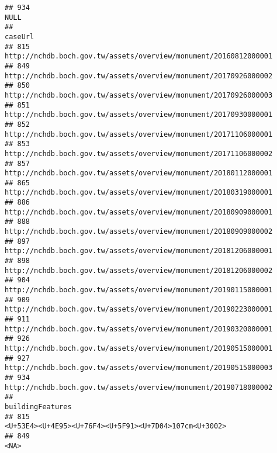 \documentclass[
]{article}
\begin{document}
\begin{verbatim}
## 934                                                                                                                                                                                                                                                                                                                               NULL
##                                                              caseUrl
## 815 http://nchdb.boch.gov.tw/assets/overview/monument/20160812000001
## 849 http://nchdb.boch.gov.tw/assets/overview/monument/20170926000002
## 850 http://nchdb.boch.gov.tw/assets/overview/monument/20170926000003
## 851 http://nchdb.boch.gov.tw/assets/overview/monument/20170930000001
## 852 http://nchdb.boch.gov.tw/assets/overview/monument/20171106000001
## 853 http://nchdb.boch.gov.tw/assets/overview/monument/20171106000002
## 857 http://nchdb.boch.gov.tw/assets/overview/monument/20180112000001
## 865 http://nchdb.boch.gov.tw/assets/overview/monument/20180319000001
## 886 http://nchdb.boch.gov.tw/assets/overview/monument/20180909000001
## 888 http://nchdb.boch.gov.tw/assets/overview/monument/20180909000002
## 897 http://nchdb.boch.gov.tw/assets/overview/monument/20181206000001
## 898 http://nchdb.boch.gov.tw/assets/overview/monument/20181206000002
## 904 http://nchdb.boch.gov.tw/assets/overview/monument/20190115000001
## 909 http://nchdb.boch.gov.tw/assets/overview/monument/20190223000001
## 911 http://nchdb.boch.gov.tw/assets/overview/monument/20190320000001
## 926 http://nchdb.boch.gov.tw/assets/overview/monument/20190515000001
## 927 http://nchdb.boch.gov.tw/assets/overview/monument/20190515000003
## 934 http://nchdb.boch.gov.tw/assets/overview/monument/20190718000002
##                                                                                                                                                                                                                                                                                               buildingFeatures
## 815                                                                                                                                                                                                                                                      <U+53E4><U+4E95><U+76F4><U+5F91><U+7D04>107cm<U+3002>
## 849                                                                                                                                                                                                                                                                                                       <NA>

\end{verbatim}
\end{document}

